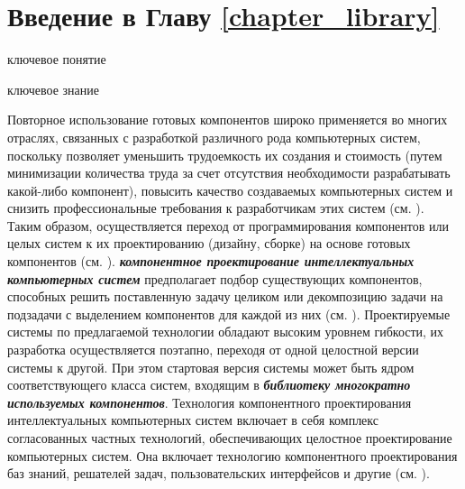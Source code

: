 \section*{Введение в Главу \ref{chapter_library}}
\label{ostis_library_introduction}

\begin{SCn}
\begin{scnrelfromlist}{ключевое понятие}
\end{scnrelfromlist}
\end{SCn}

\bigskip

\begin{SCn}
\begin{scnrelfromlist}{ключевое знание}
\end{scnrelfromlist}
\end{SCn}

\bigskip

Повторное использование готовых компонентов широко применяется во многих отраслях, связанных с разработкой различного рода компьютерных систем, поскольку позволяет уменьшить трудоемкость их создания и стоимость (путем минимизации количества труда за счет отсутствия необходимости разрабатывать какой-либо компонент), повысить качество создаваемых компьютерных систем и снизить профессиональные требования к разработчикам этих систем (см. ). Таким образом, осуществляется переход от программирования компонентов или целых систем к их проектированию (дизайну, сборке) на основе готовых компонентов (см. ). \textbf{\textit{компонентное проектирование интеллектуальных компьютерных систем}} предполагает подбор существующих компонентов, способных решить поставленную задачу целиком или декомпозицию задачи на подзадачи с выделением компонентов для каждой из них (см. ). Проектируемые системы по предлагаемой технологии обладают высоким уровнем гибкости, их разработка осуществляется поэтапно, переходя от одной целостной версии системы к другой. При этом стартовая версия системы может быть ядром соответствующего класса систем, входящим в \textbf{\textit{библиотеку многократно используемых компонентов}}. Технология компонентного проектирования интеллектуальных компьютерных систем включает в себя комплекс согласованных частных технологий, обеспечивающих целостное проектирование компьютерных систем. Она включает технологию компонентного проектирования баз знаний, решателей задач, пользовательских интерфейсов и другие (см. ). 

